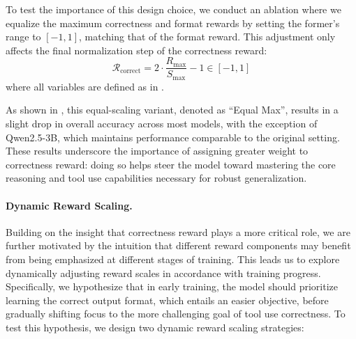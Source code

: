 To test the importance of this design choice, we conduct an ablation where we equalize the maximum correctness and format rewards by setting the former’s range to \([-1, 1]\), matching that of the format reward. This adjustment only affects the final normalization step of the correctness reward:
\begin{equation*}
\mathcal{R}_{\text{correct}} = 2 \cdot \frac{R_{\max}}{S_{\max}} - 1 \in [-1, 1]
\end{equation*}
where all variables are defined as in .



As shown in , this equal-scaling variant, denoted as ``Equal Max'', results in a slight drop in overall accuracy across most models, with the exception of Qwen2.5-3B, which maintains performance comparable to the original setting. These results underscore the importance of assigning greater weight to correctness reward: doing so helps steer the model toward mastering the core reasoning and tool use capabilities necessary for robust generalization.

\paragraph{Dynamic Reward Scaling.} Building on the insight that correctness reward plays a more critical role, we are further motivated by the intuition that different reward components may benefit from being emphasized at different stages of training. This leads us to explore dynamically adjusting reward scales in accordance with training progress. Specifically, we hypothesize that in early training, the model should prioritize learning the correct output format, which entails an easier objective, before gradually shifting focus to the more challenging goal of tool use correctness. To test this hypothesis, we design two dynamic reward scaling strategies:

